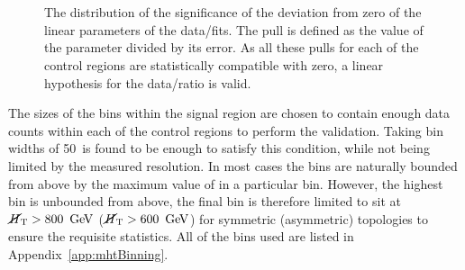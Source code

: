\begin{figure}[h!]
  \centering
  ~~
  \\
  ~~
  \\
  \caption{
  The distribution of the significance of the deviation from zero of
  the linear parameters of the data/\MC fits. The pull is defined as
  the value of the parameter divided by its error. As all these pulls
  for each of the control regions are statistically compatible with
  zero, a linear hypothesis for the \MHT data/\MC ratio is valid.}
  \label{fig:pulls} 
\end{figure}

The sizes of the \MHT bins within the signal region are chosen to
contain enough data counts within each of the control regions to
perform the validation. Taking \MHT bin widths of 50~\gev is found
to be enough to satisfy this condition, while not being limited by the
measured \MHT resolution. In most cases the \MHT bins
are naturally bounded from above by the maximum value of \HT in a
particular bin.  However, the highest \HT bin is unbounded from above,
the final \MHT bin is therefore limited to sit at $\mbox{$\cancel{H}_\text{T}$}>800~\mathrm{\,Ge\kern -0.1em V}$
($\mbox{$\cancel{H}_\text{T}$}>600~\mathrm{\,Ge\kern -0.1em V}$) for symmetric (asymmetric) topologies to
ensure the requisite statistics. All of the bins used are listed in
Appendix~\ref{app:mhtBinning}.


